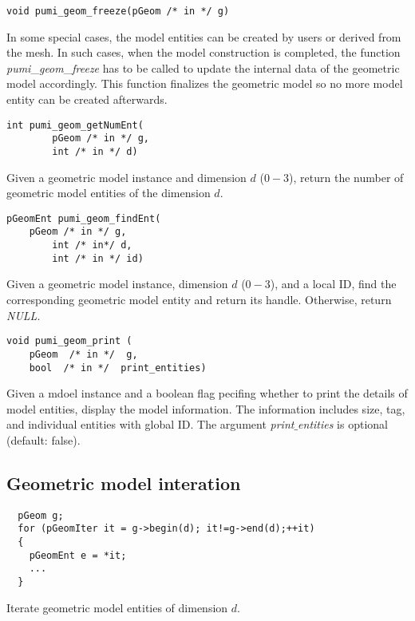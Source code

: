 \begin{verbatim}
void pumi_geom_freeze(pGeom /* in */ g) 
\end{verbatim}
\vspace{-.5cm}\hspace{1cm}
In some special cases, the model entities can be created by users or derived from the mesh. 
In such cases, when the model construction is completed, the function \emph{pumi}\_\emph{geom}\_\emph{freeze} has to be called to update the internal data of the geometric model accordingly. This function finalizes the geometric model so no more model entity can be created afterwards.

\begin{verbatim}
int pumi_geom_getNumEnt(
        pGeom /* in */ g, 
        int /* in */ d)
\end{verbatim}
\vspace{-.5cm}\hspace{1cm}
Given a geometric model instance and dimension $d$ ($0-3$), return the number of geometric model entities of the dimension $d$.

\begin{verbatim}
pGeomEnt pumi_geom_findEnt(
	pGeom /* in */ g, 
        int /* in*/ d, 
        int /* in */ id)
\end{verbatim}
Given a geometric model instance, dimension $d$ ($0-3$), and a local ID, find the corresponding geometric model entity and return its handle. Otherwise, return \emph{NULL}.

\begin{verbatim}
void pumi_geom_print (
    pGeom  /* in */  g,
    bool  /* in */  print_entities)
\end{verbatim}\vspace{-.5cm}\hspace{1cm}
        Given a mdoel instance and a boolean flag pecifing whether to print the details of model entities, display the model information. The information includes size, tag, and individual entities with global ID. The argument \emph{print$\_$entities} is optional (default: false).

\subsection{Geometric model interation}
\begin{verbatim}
  pGeom g;
  for (pGeomIter it = g->begin(d); it!=g->end(d);++it)
  {
    pGeomEnt e = *it;
    ...
  }
\end{verbatim}\vspace{-.5cm}\hspace{1cm}
Iterate geometric model entities of dimension $d$.

